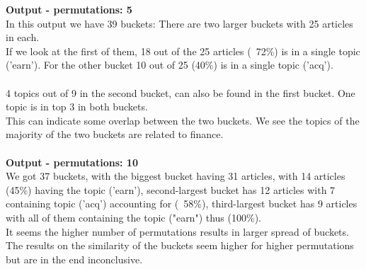 \documentclass{article}
\begin{document}
\textbf{Output - permutations: 5}\\
In this output we have 39 buckets: There are two larger buckets with 25 articles in each. ~\\
If we look at the first of them, 18 out of the 25 articles (~72\%) is in a single topic ('earn'). For the other bucket 10 out of 25 (40\%) is in a single topic ('acq'). \\
~\\
4 topics out of 9 in the second bucket, can also be found in the first bucket. One topic is in top 3 in both buckets. ~\\
This can indicate some overlap between the two buckets. We see the topics of the majority of the two buckets are related to finance. \\
~\\
\textbf{Output - permutations: 10}\\
We got 37 buckets, with the biggest bucket having 31 articles, with 14 articles (45\%) having the topic ('earn'), second-largest bucket has 12 articles with 7 containing topic ('acq') accounting for (~58\%), third-largest bucket has 9 articles with all of them containing the topic ("earn") thus (100\%).
~\\

It seems the higher number of permutations results in larger spread of buckets.
The results on the similarity of the buckets seem higher for higher permutations but are in the end inconclusive.
\end{document}
